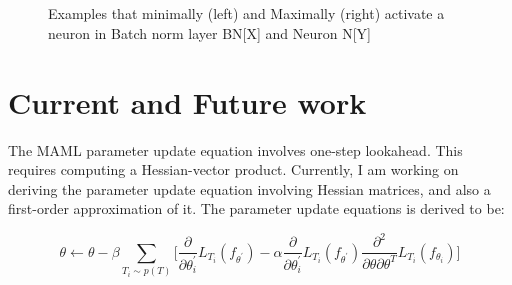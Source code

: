 \documentclass[10pt,twocolumn,letterpaper]{article}
\newcommand{\rulesep}{\unskip\ \vrule\ }
\begin{document}
\begin{figure}
    \\
    \rulesep
    
    \caption{Examples that minimally (left) and Maximally (right) activate a neuron in Batch norm layer BN[X] and Neuron N[Y]}%
    \label{fig:neuron-vis}%
\end{figure}




\section{Current and Future work}

The MAML parameter update equation involves one-step lookahead. This requires computing a Hessian-vector product. Currently, I am working on deriving the parameter update equation involving Hessian matrices, and also a first-order approximation of it. The parameter update equations is derived to be:

\begin{equation}
\theta \leftarrow \theta - \beta \sum_{T_i \sim p(T)} \Big[ \frac{\partial}{\partial \theta_i^{'}} L_{T_i} (f_{\theta^{'}}) - \alpha \frac{\partial}{\partial \theta_i^{'}} L_{T_i} (f_{\theta^{'}}) \frac{\partial^2}{\partial \theta \partial \theta^T} L_{T_i} (f_{\theta_i}) \Big]
\end{equation}
\end{document}
